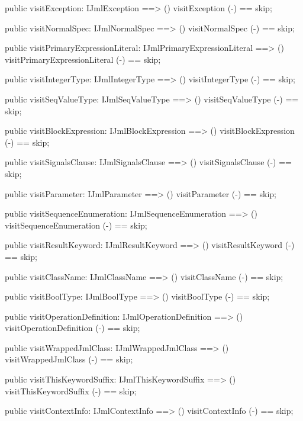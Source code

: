 \begin{vdm_al}
  public visitException: IJmlException ==> ()
  visitException (-) == skip;

  public visitNormalSpec: IJmlNormalSpec ==> ()
  visitNormalSpec (-) == skip;

  public visitPrimaryExpressionLiteral: IJmlPrimaryExpressionLiteral ==> ()
  visitPrimaryExpressionLiteral (-) == skip;

  public visitIntegerType: IJmlIntegerType ==> ()
  visitIntegerType (-) == skip;

  public visitSeqValueType: IJmlSeqValueType ==> ()
  visitSeqValueType (-) == skip;

  public visitBlockExpression: IJmlBlockExpression ==> ()
  visitBlockExpression (-) == skip;

  public visitSignalsClause: IJmlSignalsClause ==> ()
  visitSignalsClause (-) == skip;

  public visitParameter: IJmlParameter ==> ()
  visitParameter (-) == skip;

  public visitSequenceEnumeration: IJmlSequenceEnumeration ==> ()
  visitSequenceEnumeration (-) == skip;

  public visitResultKeyword: IJmlResultKeyword ==> ()
  visitResultKeyword (-) == skip;

  public visitClassName: IJmlClassName ==> ()
  visitClassName (-) == skip;

  public visitBoolType: IJmlBoolType ==> ()
  visitBoolType (-) == skip;

  public visitOperationDefinition: IJmlOperationDefinition ==> ()
  visitOperationDefinition (-) == skip;

  public visitWrappedJmlClass: IJmlWrappedJmlClass ==> ()
  visitWrappedJmlClass (-) == skip;

  public visitThisKeywordSuffix: IJmlThisKeywordSuffix ==> ()
  visitThisKeywordSuffix (-) == skip;

  public visitContextInfo: IJmlContextInfo ==> ()
  visitContextInfo (-) == skip;


\end{vdm_al}
